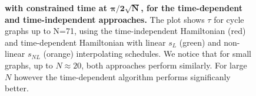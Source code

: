 \begin{figure}[ht]
  \centering
  \caption{\textbf{\bm{$\tau$} with constrained time at $\bm{\pi/2\sqrt{N}}$, for the time-dependent and time-independent approaches.} The plot shows $\tau$ for cycle graphs up to N=71, using the time-independent Hamiltonian (red) and time-dependent Hamiltonian with linear $s_L$ (green) and non-linear $s_{NL}$ (orange) interpolating schedules. We notice that for small graphs, up to $N\approx 20$, both approaches perform similarly. For large $N$ however the time-dependent algorithm performs significanly better.}
  \label{fig:delta_increasing_time}
\end{figure}
